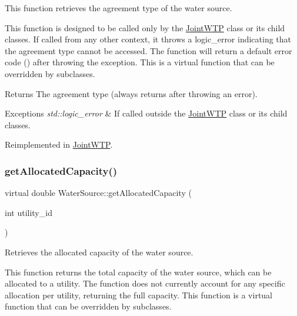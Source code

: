 This function retrieves the agreement type of the water source. 

This function is designed to be called only by the {\ttfamily \mbox{\hyperlink{classJointWTP}{Joint\+W\+TP}}} class or its child classes. If called from any other context, it throws a {\ttfamily logic\+\_\+error} indicating that the agreement type cannot be accessed. The function will return a default error code ({}) after throwing the exception. This is a virtual function that can be overridden by subclasses.

\begin{DoxyReturn}{Returns}
The agreement type (always returns {} after throwing an error).
\end{DoxyReturn}

\begin{DoxyExceptions}{Exceptions}
{\em std\+::logic\+\_\+error} & If called outside the {\ttfamily \mbox{\hyperlink{classJointWTP}{Joint\+W\+TP}}} class or its child classes. \\
\hline
\end{DoxyExceptions}


Reimplemented in \mbox{\hyperlink{classJointWTP_a4580529f08f6499def6aae2655484e48}{Joint\+W\+TP}}.

\mbox{\label{classWaterSource_ad218f2a603d7ebce268d800e0249a74c}} 
\subsubsection{\texorpdfstring{get\+Allocated\+Capacity()}{getAllocatedCapacity()}}
{\footnotesize\ttfamily virtual double Water\+Source\+::get\+Allocated\+Capacity (\begin{DoxyParamCaption}\item[{int}]{utility\+\_\+id }\end{DoxyParamCaption})\hspace{0.3cm}{\ttfamily [virtual]}}



Retrieves the allocated capacity of the water source. 

This function returns the total capacity of the water source, which can be allocated to a utility. The function does not currently account for any specific allocation per utility, returning the full capacity. This function is a virtual function that can be overridden by subclasses.



